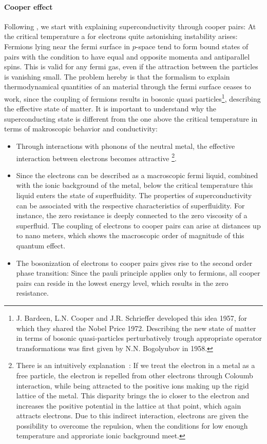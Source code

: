 \paragraph{Cooper effect} Following \cite{Landau}, we start with explaining superconductivity through
cooper pairs: At the critical temperature a for electrons quite astonishing instability arises: Fermions lying 
near the fermi surface in $p$-space tend to form bound states of pairs with the condition to have equal and
opposite momenta and antiparallel spins. This is valid for any fermi gas, even if the attraction between the
particles is vanishing small. The problem hereby is that the formalism to explain thermodynamical quantities 
of an material through the fermi surface ceases to work, since the coupling of fermions results in bosonic quasi
particles\footnote{J. Bardeen, L.N. Cooper and J.R. Schrieffer developed this idea 1957, for which
they shared the Nobel Price 1972. Describing the new state of matter in terms of bosonic quasi-particles perturbatively 
trough appropriate operator transformations was first given by N.N. Bogolyubov in 1958.}, 
describing the effective state of matter. It is important to understand why the superconducting state 
is different from the one above the critical temperature in terms of makroscopic behavior and conductivity:
\begin{itemize}
\item Through interactions with phonons of the neutral metal, the effective interaction between electrons becomes attractive
\footnote{There is an intuitively explanation~\cite{cooper1956bound}: If we treat the electron in a metal
as a free particle, the electron is repelled from other electrons through Coloumb interaction, while
being attracted to the positive ions making up the rigid lattice of the metal. This disparity 
brings the io closer to the electron and increases the positive potential in the lattice at that point, which again
attracts electrons. Due to this indirect interaction, electrons are given the possibility to overcome the repulsion,
when the conditions for low enough temperature and approriate ionic background meet.
}. 
\item Since the electrons can be described as a macroscopic fermi liquid, combined with the ionic background of the metal, 
below the critical temperature this liquid enters the state of superfluidity. The properties of superconductivity can be 
associated with the respective characteristics of superfluidity. For instance, the zero resistance is deeply connected 
to the zero viscosity of a superfluid. The coupling of electrons to cooper pairs can arise at distances up to nano meters,
which shows the macroscopic order of magnitude of this quantum effect.
\item The bosonization of electrons to cooper pairs gives rise to the second order phase transition: Since 
the pauli principle applies only to fermions, all cooper pairs can reside in the lowest energy level,
which results in the zero resistance. 
\end{itemize}   
